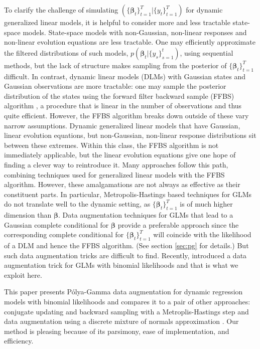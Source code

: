 \documentclass[12pt]{article}
\newcommand{\Polya}{P\'{o}lya}
\newcommand{\bbeta}{\boldsymbol{\beta}}
\newcounter{parnum}
\newcommand{\npoint}{%
  \noindent\refstepcounter{parnum}%
  \makebox[0.5in][c]{\textbf{\arabic{parnum}.}} %
  \marginnote{\small\ttfamily\the\inputlineno}}
\renewcommand{\npoint}{}
\begin{document}
\npoint To clarify the challenge of simulating $(\{\bbeta_t\}_{t=1}^T |
\{y_t\}_{t=1}^T)$ for dynamic generalized linear models, it is helpful to
consider more and less tractable state-space models.  
\npoint State-space models with non-Gaussian, non-linear responses and
non-linear evolution equations are less tractable.  One may efficiently
approximate the filtered distributions of such models, $p(\bbeta_t |
\{y_s\}_{s=1}^t)$, using sequential methods, but the lack of structure makes
sampling from the posterior of $\{\bbeta_t\}_{t=1}^T$ difficult.  
\npoint In contrast, dynamic linear models (DLMs) with Gaussian states and
Gaussian observations are more tractable: one may sample the posterior
distribution of the states using the forward filter backward sample (FFBS)
algorithm \citep{carter-kohn-1994, fruhwirth-schnatter-1994}, a procedure that
is linear in the number of observations and thus quite efficient.  However, the
FFBS algorithm breaks down outside of these vary narrow assumptions.
\npoint Dynamic generalized linear models that have Gaussian, linear evolution
equations, but non-Gaussian, non-linear response distributions sit between these
extremes.  Within this class, the FFBS algorithm is not immediately applicable,
but the linear evolution equations give one hope of finding a clever way to
reintroduce it.  Many approaches follow this path, combining techniques used for
generalized linear models with the FFBS algorithm.  However, these amalgamations
are not always as effective as their constituent parts.  In particular,
Metropolis-Hastings based techniques for GLMs do not translate well to the
dynamic setting, as $\{\bbeta_t\}_{t=1}^T$ is of much higher dimension than
$\bbeta$.  
\npoint Data augmentation techniques for GLMs that lead to a Gaussian complete
conditional for $\bbeta$ provide a preferable approach since the corresponding
complete conditional for $\{\bbeta_t\}_{t=1}^T$ will coincide with the
likelihood of a DLM and hence the FFBS algorithm.  (See section \ref{sec:pg} for
details.)  But such data augmentation tricks are difficult to find.  Recently,
\cite{polson-etal-2013} introduced a data augmentation trick for GLMs with
binomial likelihoods and that is what we exploit here.

\npoint This paper presents \Polya-Gamma data augmentation for dynamic
regression models with binomial likelihoods and compares it to a pair of other
approaches: conjugate updating and backward sampling with a Metroplis-Hastings
step \citep{migon-etal-2013} and data augmentation using a discrete mixture of
normals approximation \citep{fruhwirth-schnatter-etal-2009, fussl-etal-2013}.
Our method is pleasing because of its parsimony, ease of implementation, and
efficiency.
\end{document}
